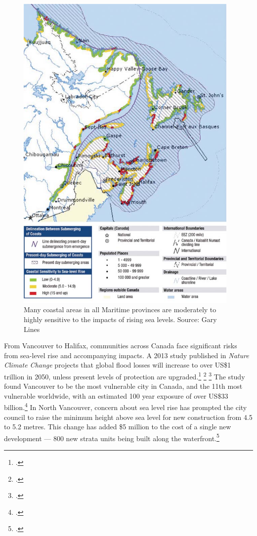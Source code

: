 \begin{figure}
\includegraphics[height=160mm]{s3-coastalsealevel.png}
\centering
\caption{Many coastal areas in all Maritime provinces are moderately to highly sensitive to the impacts of rising sea  levels. Source: Gary Lines}
\label{fig:s3-coastalsealevel}
\end{figure}



From Vancouver to Halifax, communities across Canada face significant risks from sea-level rise and accompanying impacts. 
A 2013 study published in \emph{Nature Climate Change} projects that global flood losses will increase to over US\$1 trillion in 2050, unless present levels of protection are upgraded.\footcite[][]{Hallegatte2013} \footcite[See also: ][]{Moore2013} \footcite[][]{VancouverFlooding2013}
The study found Vancouver to be the most vulnerable city in Canada, and the 11th most vulnerable worldwide, with an estimated 100 year exposure of over US\$33 billion.\footcite[][p. 2]{Hallegatte2013}
In North Vancouver, concern about sea level rise has prompted the city council to raise the minimum height above sea level for new construction from 4.5 to 5.2 metres.
This change has added \$5 million to the cost of a single new development --- 800 new strata units being built along the waterfront.\footcite[][]{RichterNorthVan2013}



